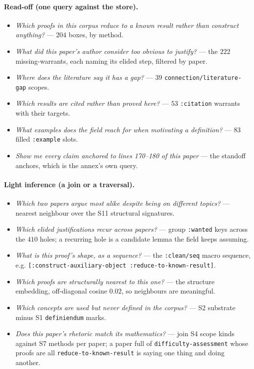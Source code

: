 \paragraph{Read-off (one query against the store).}
\begin{itemize}
\item \emph{Which proofs in this corpus reduce to a known result rather than
construct anything?} --- $204$ boxes, by method.
\item \emph{What did this paper's author consider too obvious to justify?} ---
the $222$ missing-warrants, each naming its elided step, filtered by paper.
\item \emph{Where does the literature say it has a gap?} ---
$39$ \texttt{connection/literature-gap} scopes.
\item \emph{Which results are cited rather than proved here?} --- $53$
\texttt{:citation} warrants with their targets.
\item \emph{What examples does the field reach for when motivating a
definition?} --- $83$ filled \texttt{:example} slots.
\item \emph{Show me every claim anchored to lines 170--180 of this paper} ---
the standoff anchors, which is the annex's own query.
\end{itemize}

\paragraph{Light inference (a join or a traversal).}
\begin{itemize}
\item \emph{Which two papers argue most alike despite being on different
topics?} --- nearest neighbour over the S11 structural signatures.
\item \emph{Which elided justifications recur across papers?} --- group
\texttt{:wanted} keys across the $410$ holes; a recurring hole is a candidate
lemma the field keeps assuming.
\item \emph{What is this proof's shape, as a sequence?} --- the
\texttt{:clean/seq} macro sequence, e.g.
\texttt{[:construct-auxiliary-object :reduce-to-known-result]}.
\item \emph{Which proofs are structurally nearest to this one?} --- the
structure embedding, off-diagonal cosine $0.02$, so neighbours are meaningful.
\item \emph{Which concepts are used but never defined in the corpus?} ---
S2 substrate minus S1 \texttt{definiendum} marks.
\item \emph{Does this paper's rhetoric match its mathematics?} --- join S4
scope kinds against S7 methods per paper; a paper full of
\texttt{difficulty-assessment} whose proofs are all
\texttt{reduce-to-known-result} is saying one thing and doing another.
\end{itemize}

